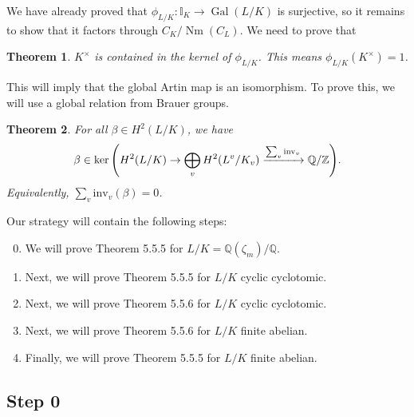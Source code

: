 \documentclass[leqno, openany]{memoir}
\newtheorem{thm}{Theorem}[section]
\theoremstyle{definition}
\theoremstyle{remark}
\theoremstyle{plain}
\theoremstyle{definition}
\theoremstyle{remark}
\newcommand{\Z}{\mathbb{Z}}
\newcommand{\Q}{\mathbb{Q}}
\newcommand{\I}{\mathbb{I}}
\newcommand{\mr}[1]{\mathrm{#1}}
\DeclareMathOperator{\Gal}{Gal}
\DeclareMathOperator{\Nm}{Nm}
\begin{document}
We have already proved that $\phi_{L/K} \colon \I_K \to \Gal(L/K)$ is
surjective, so it remains to show that it factors through $C_K/\Nm(C_L)$. We
need to prove that \begin{thm} $K^{\times}$ is contained in the kernel of
    $\phi_{L/K}$. This means $\phi_{L/K}(K^{\times}) = 1$.  \end{thm} This will
    imply that the global Artin map is an isomorphism. To prove this, we will
    use a global relation from Brauer groups.

\begin{thm} For all $\beta \in H^2(L/K)$, we have \[ \beta \in \ker
\qty(H^2(L/K) \to \bigoplus_v H^2(L^v/K_v) \xrightarrow{\sum_v \mr{inv}_v}
\Q/\Z). \] Equivalently, $\sum_v \mr{inv}_v(\beta) = 0$.  \end{thm}

Our strategy will contain the following steps: \begin{enumerate}
    \setcounter{enumi}{-1} \item We will prove Theorem 5.5.5 for $L/K =
    \Q(\zeta_m)/\Q$.  \item Next, we will prove Theorem 5.5.5 for $L/K$ cyclic
    cyclotomic.  \item Next, we will prove Theorem 5.5.6 for $L/K$ cyclic
    cyclotomic.  \item Next, we will prove Theorem 5.5.6 for $L/K$ finite
    abelian.  \item Finally, we will prove Theorem 5.5.5 for $L/K$ finite
    abelian.  \end{enumerate}

\subsection{Step 0}%
\end{document}
